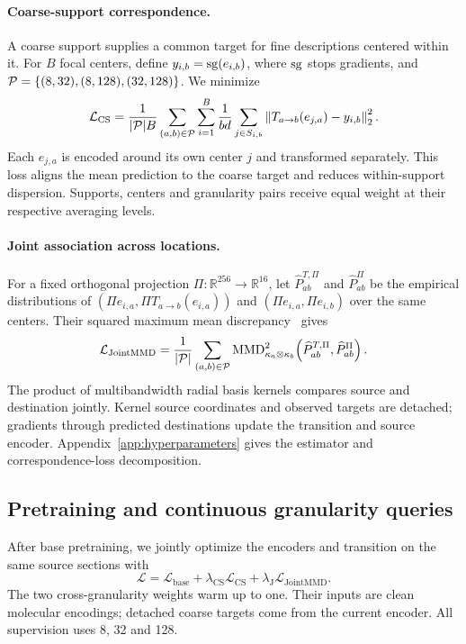 \paragraph{Coarse-support correspondence.}
A coarse support supplies a common target for fine descriptions centered within it. For $B$ focal centers, define $y_{i,b}=\operatorname{sg}(e_{i,b})$, where $\operatorname{sg}$ stops gradients, and $\mathcal{P}=\{(8,32),(8,128),(32,128)\}$. We minimize
\begin{equation}
\mathcal L_{\mathrm{CS}}
=\frac{1}{|\mathcal{P}|B}\sum_{(a,b)\in\mathcal{P}}\sum_{i=1}^{B}
\frac{1}{bd}\sum_{j\in S_{i,b}}
\left\|T_{a\to b}(e_{j,a})-y_{i,b}\right\|_2^2.
\label{eq:coarse-support-loss}
\end{equation}
Each $e_{j,a}$ is encoded around its own center $j$ and transformed separately. This loss aligns the mean prediction to the coarse target and reduces within-support dispersion. Supports, centers and granularity pairs receive equal weight at their respective averaging levels.

\paragraph{Joint association across locations.}
For a fixed orthogonal projection $\Pi:\mathbb R^{256}\to\mathbb R^{16}$, let $\widehat P_{ab}^{T,\Pi}$ and $\widehat P_{ab}^{\Pi}$ be the empirical distributions of $(\Pi e_{i,a},\Pi T_{a\to b}(e_{i,a}))$ and $(\Pi e_{i,a},\Pi e_{i,b})$ over the same centers. Their squared maximum mean discrepancy~\citep{gretton2012mmd} gives
\begin{equation}
\mathcal L_{\mathrm{JointMMD}}=\frac{1}{|\mathcal{P}|}\sum_{(a,b)\in\mathcal{P}}
\operatorname{MMD}_{\kappa_a\otimes\kappa_b}^2
\!\left(\widehat P_{ab}^{T,\Pi},\widehat P_{ab}^{\Pi}\right).
\label{eq:granularity-joint}
\end{equation}
The product of multibandwidth radial basis kernels compares source and destination jointly. Kernel source coordinates and observed targets are detached; gradients through predicted destinations update the transition and source encoder. Appendix~\ref{app:hyperparameters} gives the estimator and correspondence-loss decomposition.

\subsection{Pretraining and continuous granularity queries}
\label{sec:training-queries}

After base pretraining, we jointly optimize the encoders and transition on the same source sections with
\begin{equation}
\mathcal L=\mathcal L_{\mathrm{base}}+\lambda_{\mathrm{CS}}\mathcal L_{\mathrm{CS}}
+\lambda_{\mathrm{J}}\mathcal L_{\mathrm{JointMMD}}.
\label{eq:full-objective}
\end{equation}
The two cross-granularity weights warm up to one. Their inputs are clean molecular encodings; detached coarse targets come from the current encoder. All supervision uses 8, 32 and 128.

